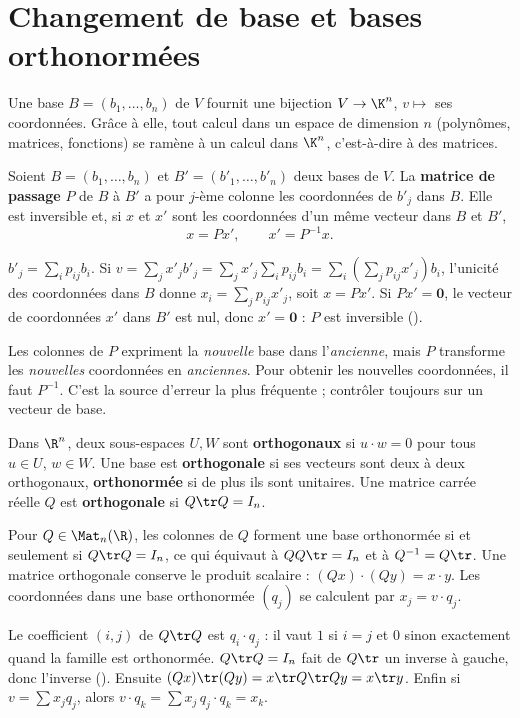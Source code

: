 \section{Changement de base et bases orthonormées}
\begin{essentiel}
Une base $B=(b_1,\dots,b_n)$ de $V$ fournit une bijection $V\to\K^n$, $v\mapsto$ ses coordonnées. Grâce à elle, tout calcul dans un espace de dimension $n$ (polynômes, matrices, fonctions) se ramène à un calcul dans $\K^n$, c'est-à-dire à des matrices.
\end{essentiel}
\begin{proposition}\label{prop-passage}
Soient $B=(b_1,\dots,b_n)$ et $B'=(b'_1,\dots,b'_n)$ deux bases de $V$. La \textbf{matrice de passage} $P$ de $B$ à $B'$ a pour $j$-ème colonne les coordonnées de $b'_j$ dans $B$. Elle est inversible et, si $x$ et $x'$ sont les coordonnées d'un même vecteur dans $B$ et $B'$,
\[x=Px',\qquad x'=P^{-1}x.\]
\end{proposition}
\begin{preuve}
$b'_j=\sum_ip_{ij}b_i$. Si $v=\sum_jx'_jb'_j=\sum_j x'_j\sum_ip_{ij}b_i=\sum_i\left(\sum_jp_{ij}x'_j\right)b_i$, l'unicité des coordonnées dans $B$ donne $x_i=\sum_jp_{ij}x'_j$, soit $x=Px'$. Si $Px'=\mathbf 0$, le vecteur de coordonnées $x'$ dans $B'$ est nul, donc $x'=\mathbf 0$ : $P$ est inversible ().
\end{preuve}
\begin{attention}
Les colonnes de $P$ expriment la \emph{nouvelle} base dans l'\emph{ancienne}, mais $P$ transforme les \emph{nouvelles} coordonnées en \emph{anciennes}. Pour obtenir les nouvelles coordonnées, il faut $P^{-1}$. C'est la source d'erreur la plus fréquente ; contrôler toujours sur un vecteur de base.
\end{attention}
\begin{definition}
Dans $\R^n$, deux sous-espaces $U,W$ sont \textbf{orthogonaux} si $u\cdot w=0$ pour tous $u\in U$, $w\in W$. Une base est \textbf{orthogonale} si ses vecteurs sont deux à deux orthogonaux, \textbf{orthonormée} si de plus ils sont unitaires. Une matrice carrée réelle $Q$ est \textbf{orthogonale} si $Q\tr Q=I_n$.
\end{definition}
\begin{proposition}\label{prop-orthogonale}
Pour $Q\in\Mat_n(\R)$, les colonnes de $Q$ forment une base orthonormée si et seulement si $Q\tr Q=I_n$, ce qui équivaut à $QQ\tr=I_n$ et à $Q^{-1}=Q\tr$. Une matrice orthogonale conserve le produit scalaire : $(Qx)\cdot(Qy)=x\cdot y$. Les coordonnées dans une base orthonormée $(q_j)$ se calculent par $x_j=v\cdot q_j$.
\end{proposition}
\begin{preuve}
Le coefficient $(i,j)$ de $Q\tr Q$ est $q_i\cdot q_j$ : il vaut $1$ si $i=j$ et $0$ sinon exactement quand la famille est orthonormée. $Q\tr Q=I_n$ fait de $Q\tr$ un inverse à gauche, donc l'inverse (). Ensuite $(Qx)\tr(Qy)=x\tr Q\tr Qy=x\tr y$. Enfin si $v=\sum x_jq_j$, alors $v\cdot q_k=\sum x_j\,q_j\cdot q_k=x_k$.
\end{preuve}

